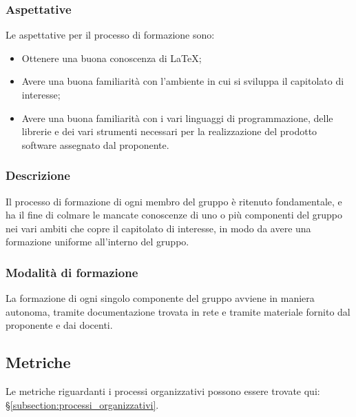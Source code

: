 \subsubsection {Aspettative}
Le aspettative per il processo di formazione sono:
\begin {itemize}
\item Ottenere una buona conoscenza di \LaTeX{};
\item Avere una buona familiarità con l'ambiente in cui si sviluppa il capitolato di interesse;
\item Avere una buona familiarità con i vari linguaggi di programmazione, delle librerie e dei vari strumenti necessari per la realizzazione del prodotto software assegnato dal proponente.
\end {itemize}
\subsubsection {Descrizione}
Il processo di formazione di ogni membro del gruppo \groupName{} è ritenuto fondamentale, e ha il fine di colmare le mancate conoscenze di uno o più componenti del gruppo nei vari ambiti che copre il capitolato di interesse, in modo da avere una formazione uniforme all'interno del gruppo.
\subsubsection {Modalità di formazione}
La formazione di ogni singolo componente del gruppo avviene in maniera autonoma, tramite documentazione trovata in rete e tramite materiale fornito dal proponente e dai docenti.

\subsection{Metriche}
Le metriche riguardanti i processi organizzativi possono essere trovate qui: §\ref{subsection:processi_organizzativi}.